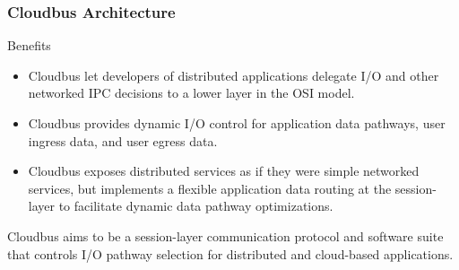 \begin{frame}
	\frametitle{Cloudbus Architecture}
	\begin{block}{Benefits}
		\begin{itemize}
			\item Cloudbus let developers of distributed applications delegate I/O and other networked IPC decisions to a lower layer in the %
			OSI model.
			\item Cloudbus provides dynamic I/O control for application data pathways, user ingress data, and user egress data.
			\item Cloudbus exposes distributed services as if they were simple networked services, but implements a flexible application data %
			routing at the session-layer to facilitate dynamic data pathway optimizations.
		\end{itemize}
		Cloudbus aims to be a session-layer communication protocol and software suite that controls I/O pathway selection for distributed %
		and cloud-based applications. 
	\end{block}
\end{frame}